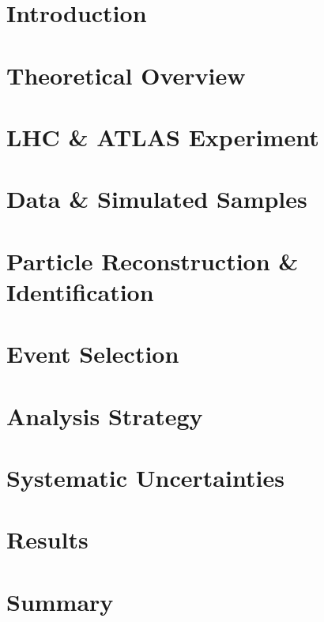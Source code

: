 \documentclass{msuphddissertation}
\begin{document}
\begin{doublespace}
{\chapter{Introduction}
\label{chap:intro}


\chapter{Theoretical Overview}
\label{chap:theory}


\chapter{LHC \& ATLAS Experiment}
\label{chap:LHCATLAS}


\chapter{Data \& Simulated Samples}
\label{chap:samples}


\chapter{Particle Reconstruction \& Identification}
\label{chap:reco}


\chapter{Event Selection}
\label{chap:sel}


\chapter{Analysis Strategy}
\label{chap:anal}


\chapter{Systematic Uncertainties}
\label{chap:sys}


\chapter{Results}
\label{chap:results}


\chapter{Summary}
\label{chap:summary}


}
\end{doublespace}
\end{document}

